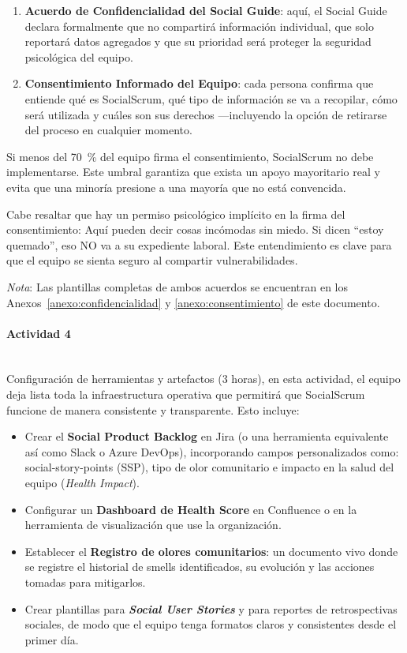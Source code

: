 \begin{enumerate}
    \item \textbf{Acuerdo de Confidencialidad del Social Guide}: aquí, el Social Guide declara formalmente que no compartirá información individual, que solo reportará datos agregados y que su prioridad será proteger la seguridad psicológica del equipo.

    \item \textbf{Consentimiento Informado del Equipo}: cada persona confirma que entiende qué es SocialScrum, qué tipo de información se va a recopilar, cómo será utilizada y cuáles son sus derechos —incluyendo la opción de retirarse del proceso en cualquier momento.
\end{enumerate}

Si menos del 70~\% del equipo firma el consentimiento, SocialScrum no debe implementarse. Este umbral garantiza que exista un apoyo mayoritario real y evita que una minoría presione a una mayoría que no está convencida.

Cabe resaltar que hay un permiso psicológico implícito en la firma del consentimiento: Aquí pueden decir cosas incómodas sin miedo. Si dicen ``estoy quemado'', eso NO va a su expediente laboral. Este entendimiento es clave para que el equipo se sienta seguro al compartir vulnerabilidades.

\emph{Nota}: Las plantillas completas de ambos acuerdos se encuentran en los Anexos~\ref{anexo:confidencialidad} y \ref{anexo:consentimiento} de este documento.

\paragraph{Actividad 4}
\mbox{}\\[-0.1\baselineskip]
Configuración de herramientas y artefactos (3 horas), en esta actividad, el equipo deja lista toda la infraestructura operativa que permitirá que SocialScrum funcione de manera consistente y transparente. Esto incluye:

\begin{itemize}
    \item Crear el \textbf{Social Product Backlog} en Jira (o una herramienta equivalente así como Slack o Azure DevOps), incorporando campos personalizados como: \gls{social-story-points} (SSP), tipo de olor comunitario e impacto en la salud del equipo (\textit{Health Impact}).
    \item Configurar un \textbf{Dashboard de Health Score} en Confluence o en la herramienta de visualización que use la organización.
    \item Establecer el \textbf{Registro de olores comunitarios}: un documento vivo donde se registre el historial de smells identificados, su evolución y las acciones tomadas para mitigarlos.
    \item Crear plantillas para \textbf{\textit{Social User Stories}} y para reportes de retrospectivas sociales, de modo que el equipo tenga formatos claros y consistentes desde el primer día.
\end{itemize}

